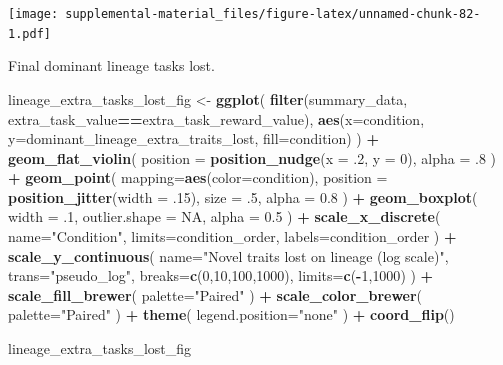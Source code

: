 \documentclass[]{book}
\newenvironment{Shaded}{\begin{snugshade}}{\end{snugshade}}
\newcommand{\DataTypeTok}[1]{\textcolor[rgb]{0.13,0.29,0.53}{#1}}
\newcommand{\DecValTok}[1]{\textcolor[rgb]{0.00,0.00,0.81}{#1}}
\newcommand{\FloatTok}[1]{\textcolor[rgb]{0.00,0.00,0.81}{#1}}
\newcommand{\KeywordTok}[1]{\textcolor[rgb]{0.13,0.29,0.53}{\textbf{#1}}}
\newcommand{\NormalTok}[1]{#1}
\newcommand{\OperatorTok}[1]{\textcolor[rgb]{0.81,0.36,0.00}{\textbf{#1}}}
\newcommand{\OtherTok}[1]{\textcolor[rgb]{0.56,0.35,0.01}{#1}}
\newcommand{\StringTok}[1]{\textcolor[rgb]{0.31,0.60,0.02}{#1}}
\begin{document}
\texttt{[image: supplemental-material\_files/figure-latex/unnamed-chunk-82-1.pdf]}

Final dominant lineage tasks lost.

\begin{Shaded}
\begin{Highlighting}[]
\NormalTok{lineage_extra_tasks_lost_fig <-}\StringTok{ }\KeywordTok{ggplot}\NormalTok{(}
    \KeywordTok{filter}\NormalTok{(summary_data, extra_task_value}\OperatorTok{==}\NormalTok{extra_task_reward_value),}
    \KeywordTok{aes}\NormalTok{(}\DataTypeTok{x=}\NormalTok{condition, }\DataTypeTok{y=}\NormalTok{dominant_lineage_extra_traits_lost, }\DataTypeTok{fill=}\NormalTok{condition)}
\NormalTok{  ) }\OperatorTok{+}
\StringTok{  }\KeywordTok{geom_flat_violin}\NormalTok{(}
    \DataTypeTok{position =} \KeywordTok{position_nudge}\NormalTok{(}\DataTypeTok{x =} \FloatTok{.2}\NormalTok{, }\DataTypeTok{y =} \DecValTok{0}\NormalTok{),}
    \DataTypeTok{alpha =} \FloatTok{.8}
\NormalTok{  ) }\OperatorTok{+}
\StringTok{  }\KeywordTok{geom_point}\NormalTok{(}
    \DataTypeTok{mapping=}\KeywordTok{aes}\NormalTok{(}\DataTypeTok{color=}\NormalTok{condition),}
    \DataTypeTok{position =} \KeywordTok{position_jitter}\NormalTok{(}\DataTypeTok{width =} \FloatTok{.15}\NormalTok{),}
    \DataTypeTok{size =} \FloatTok{.5}\NormalTok{,}
    \DataTypeTok{alpha =} \FloatTok{0.8}
\NormalTok{  ) }\OperatorTok{+}
\StringTok{  }\KeywordTok{geom_boxplot}\NormalTok{(}
    \DataTypeTok{width =} \FloatTok{.1}\NormalTok{,}
    \DataTypeTok{outlier.shape =} \OtherTok{NA}\NormalTok{,}
    \DataTypeTok{alpha =} \FloatTok{0.5}
\NormalTok{  ) }\OperatorTok{+}
\StringTok{  }\KeywordTok{scale_x_discrete}\NormalTok{(}
    \DataTypeTok{name=}\StringTok{"Condition"}\NormalTok{,}
    \DataTypeTok{limits=}\NormalTok{condition_order,}
    \DataTypeTok{labels=}\NormalTok{condition_order}
\NormalTok{  ) }\OperatorTok{+}
\StringTok{  }\KeywordTok{scale_y_continuous}\NormalTok{(}
    \DataTypeTok{name=}\StringTok{"Novel traits lost on lineage (log scale)"}\NormalTok{,}
    \DataTypeTok{trans=}\StringTok{"pseudo_log"}\NormalTok{,}
    \DataTypeTok{breaks=}\KeywordTok{c}\NormalTok{(}\DecValTok{0}\NormalTok{,}\DecValTok{10}\NormalTok{,}\DecValTok{100}\NormalTok{,}\DecValTok{1000}\NormalTok{),}
    \DataTypeTok{limits=}\KeywordTok{c}\NormalTok{(}\OperatorTok{-}\DecValTok{1}\NormalTok{,}\DecValTok{1000}\NormalTok{)}
\NormalTok{  ) }\OperatorTok{+}
\StringTok{  }\KeywordTok{scale_fill_brewer}\NormalTok{(}
    \DataTypeTok{palette=}\StringTok{"Paired"}
\NormalTok{  ) }\OperatorTok{+}
\StringTok{  }\KeywordTok{scale_color_brewer}\NormalTok{(}
    \DataTypeTok{palette=}\StringTok{"Paired"}
\NormalTok{  ) }\OperatorTok{+}
\StringTok{  }\KeywordTok{theme}\NormalTok{(}
    \DataTypeTok{legend.position=}\StringTok{"none"}
\NormalTok{  ) }\OperatorTok{+}
\StringTok{  }\KeywordTok{coord_flip}\NormalTok{()}

\NormalTok{lineage_extra_tasks_lost_fig}
\end{Highlighting}
\end{Shaded}
\end{document}
